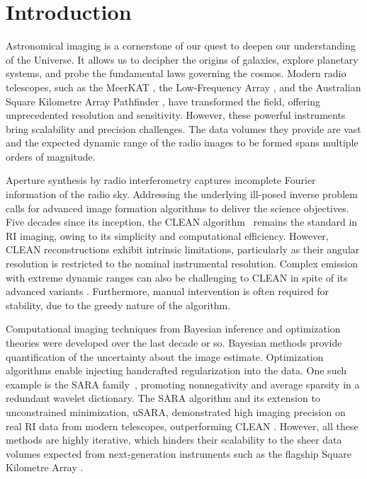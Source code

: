 \documentclass[preprint2,twocolumn]{aastex631}
\begin{document}
\section{Introduction}
Astronomical imaging is a cornerstone of our quest to deepen our understanding of the Universe. It allows us to decipher the origins of galaxies, explore planetary systems, and probe the fundamental laws governing the cosmos. Modern radio telescopes, such as the MeerKAT \citep{jonas2016proc}, the Low-Frequency Array \citep[LOFAR;][]{van2013lofar}, and the Australian Square Kilometre Array Pathfinder \citep[ASKAP;][]{hotan2021},
have transformed the field, offering unprecedented resolution and sensitivity. However, these powerful instruments bring scalability and precision challenges. The data volumes they provide are vast and the expected dynamic range of the radio images to be formed spans multiple orders of magnitude. 

Aperture synthesis by radio interferometry captures incomplete Fourier information of the radio sky. Addressing the underlying ill-posed inverse problem calls for advanced image formation algorithms to deliver the science objectives. Five decades since its inception, the CLEAN algorithm~\citep{hogbom1974aperture} remains the standard in RI imaging, owing to its simplicity and computational efficiency. However, CLEAN reconstructions exhibit intrinsic limitations, particularly as their angular resolution is restricted to the nominal instrumental resolution. Complex emission with extreme dynamic ranges can also be challenging to CLEAN in spite of its advanced variants \citep[e.g.,][]{bhatnagar2004scale,cornwell2008multiscale,offringa2014}. Furthermore, manual intervention is often required for stability, due to the greedy nature of the algorithm. 

Computational imaging techniques from Bayesian inference \citep{junklewitz2016resolve,cai2018uncertainty,arras2019unified} and optimization theories \citep[e.g.,][]{wiaux2009compressed,carrillo2012sparsity,garsden2015,dabbech2015moresane,repetti2020forward} were developed over the last decade or so. Bayesian methods provide quantification of the uncertainty about the image estimate. Optimization algorithms enable injecting handcrafted regularization into the data. One such example is the SARA family~\citep{carrillo2012sparsity,onose2016scalable,onose2017accelerated,repetti2020forward,terris2022,terris2023plug}, promoting nonnegativity and average sparsity in a redundant wavelet dictionary. The SARA algorithm and its extension to unconstrained minimization, uSARA, demonstrated high imaging precision on real RI data from modern telescopes, outperforming CLEAN \citep{dabbech2018,dabbech2022,wilber23a}. However, all these methods are highly iterative, which hinders their scalability to the sheer data volumes expected from next-generation instruments such as the flagship Square {Kilometre Array \citep[SKA; ][]{Labate2022,Swart22}}. 
\end{document}
